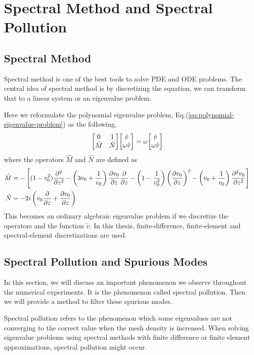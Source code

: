 \chapter{Spectral Method and Spectral Pollution}
\section{Spectral Method}
Spectral method is one of the best tools to solve PDE and ODE problems. \cite{trefethen_spectral_2000} The central idea of spectral method is by discretizing the equation, we can transform that to a linear system or an eigenvalue problem.

Here we reformulate the polynomial eigenvalue problem, Eq.(\ref{eq:polynomial-eigenvalue-problem}) as the following, 
\begin{equation} \label{eq:eigenvalue-problem}
	\mqty[ 0 & 1\\ \hat{M} & \hat{N} ]\mqty[ \tilde{v}\\ \omega \tilde{v}] = \omega\mqty[ \tilde{v}\\ \omega \tilde{v}]
\end{equation}
where the operators $\hat{M}$ and $\hat{N}$ are defined as
\begin{align*}
	\hat{M} &= -\left[(1-v_0^2)\pdv[2]{}{z} 
	-\left(3v_0 + \frac{1}{v_0}\right)\pdv{v_0}{z}\pdv{}{z} 
	- \left(1-\frac{1}{v_0^2}\right)\left(\pdv{v_0}{z}\right)^2 
	- \left(v_0+\frac{1}{v_0}\right)\pdv[2]{v_0}{z}\right] \\
	\hat{N} &= -2i\left(v_0\pdv{}{z} +\pdv{v_0}{z} \right) 
\end{align*}
This becomes an ordinary algebraic eigenvalue problem if we discretize the operators and the function $\tilde{v}$. In this thesis, finite-difference, finite-element and spectral-element discretizations are used.

\section{Spectral Pollution and Spurious Modes}
In this section, we will discuss an important phenomenon we observe throughout the numerical experiments. It is the phenomenon called spectral pollution. Then we will provide a method to filter these spurious modes.

Spectral pollution refers to the phenomenon which some eigenvalues are not converging to the correct value when the mesh density is increased. When solving eigenvalue problems using spectral methods with finite difference or finite element approximations, spectral pollution might occur. \cite{llobet_spectral_1990}

